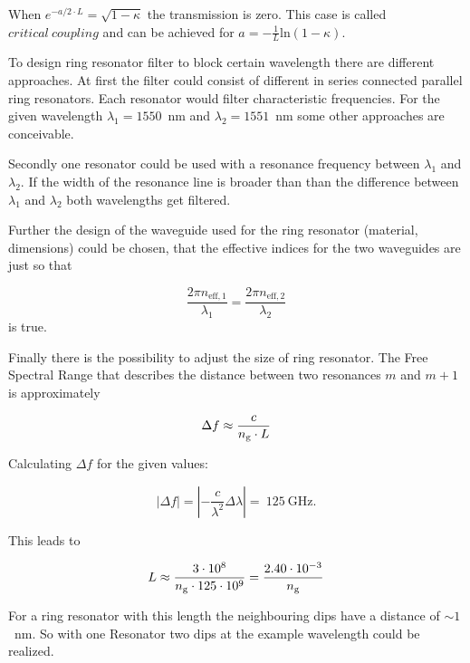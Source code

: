 When $e^{-a/2\cdot L} = \sqrt{1-\kappa}$ the transmission is zero. This case is called $critical~coupling$ and can be achieved for $a = - \frac{1}{L}\mathrm{ln}(1-\kappa)$.

To design ring resonator filter to block certain wavelength there are different approaches.
At first the filter could consist of different in series connected parallel ring resonators. Each resonator would filter characteristic frequencies.
For the given wavelength $\lambda_1 = 1550$~nm and $\lambda_2 = 1551$~nm some other approaches are conceivable.

Secondly one resonator could be used with a resonance frequency between $\lambda_1$ and $\lambda_2$. If the width of the resonance line is broader than than the difference between $\lambda_1$ and $\lambda_2$ both wavelengths get filtered.

Further the design of the waveguide used for the ring resonator (material, dimensions) could be chosen, that the effective indices for the two waveguides are just so that 

\begin{equation}
\frac{2\pi n_{\mathrm{eff,1}}}{\lambda_1} = \frac{2\pi n_{\mathrm{eff,2}}}{\lambda_2}
\label{eq:}
\end{equation}
is true.

Finally there is the possibility to adjust the size of ring resonator. The Free Spectral Range that describes the distance between two resonances $m$ and $m+1$ is approximately

\begin{equation}
\Delta f \approx \frac{c}{n_{\mathrm{g}}\cdot L}
\label{eq:abstand}
\end{equation}

Calculating $\Delta f$ for the given values:

\begin{equation}
|\Delta f| = \left|-\frac{c}{\lambda^2}\Delta\lambda\right| =~125~\mathrm{GHz}.
\label{eq:}
\end{equation}

This leads to 

\begin{equation}
L \approx \frac{3\cdot10^8}{n_{\mathrm{g}}\cdot125\cdot10^9}=\frac{2.40\cdot10^{-3}}{n_{\mathrm{g}}}
\label{eq:}
\end{equation}

For a ring resonator with this length the neighbouring dips have a distance of $\sim1$~nm. So with one Resonator two dips at the example wavelength could be realized.

